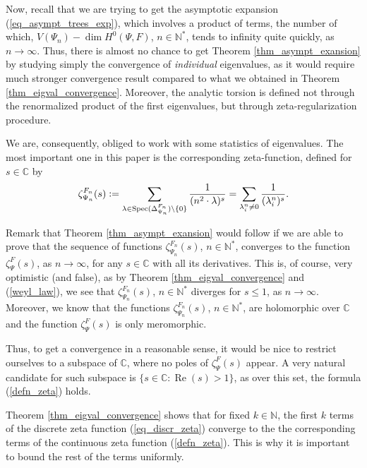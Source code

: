 \documentclass[12pt]{article}
\numberwithin{equation}{section}
\theoremstyle{theorem}
\theoremstyle{definition}
\theoremstyle{remark}
\newcommand{\comp}{\mathbb{C}}
\newcommand{\nat}{\mathbb{N}}
\newcommand{\spec}{{\rm{Spec}}}
\newcommand{\laplcomp}{\Delta}
\renewcommand{\Re}{\operatorname{Re}}
\begin{document}
	\par Now, recall that we are trying to get the asymptotic expansion (\ref{eq_asympt_trees_exp}), which involves a product of terms, the number of which, $V(\Psi_n) - \dim H^0(\Psi, F)$, $n \in \nat^*$, tends to infinity quite quickly, as $n \to \infty$. Thus, there is almost no chance to get Theorem \ref{thm_asympt_exansion} by studying simply the convergence of \textit{individual} eigenvalues, as it would require much stronger convergence result compared to what we obtained in Theorem \ref{thm_eigval_convergence}. 
	Moreover, the analytic torsion is defined not through the renormalized product of the first eigenvalues, but through zeta-regularization procedure.
	\par We are, consequently, obliged to work with some statistics of eigenvalues. 
	The most important one in this paper is the corresponding zeta-function, defined for $s \in \comp$ by
	\begin{equation}\label{eq_discr_zeta}
		\zeta_{\Psi_n}^{F_n}(s) := \sum_{\lambda \in \spec(\laplcomp_{\Psi_n}^{F_n}) \setminus \{0\} } \frac{1}{(n^2 \cdot \lambda)^s} = \sum_{\lambda_i^{n} \neq 0} \frac{1}{(\lambda_i^{n})^s}.
	\end{equation}
	\par Remark that Theorem \ref{thm_asympt_exansion} would follow if we are able to prove that the sequence of functions $\zeta_{\Psi_n}^{F_n}(s)$, $n \in \nat^*$, converges to the function $\zeta_{\Psi}^{F}(s)$, as $n \to \infty$, for any $s \in \comp$ with all its derivatives. This is, of course, very optimistic (and false), as by Theorem \ref{thm_eigval_convergence} and (\ref{weyl_law}), we see that $\zeta_{\Psi_n}^{F_n}(s)$, $n \in \nat^*$ diverges for $s \leq 1$, as $n \to \infty$. Moreover, we know that the functions $\zeta_{\Psi_n}^{F_n}(s)$, $n \in \nat^*$, are holomorphic over $\comp$ and the function $\zeta_{\Psi}^{F}(s)$ is only meromorphic. 
	\par
	Thus, to get a convergence in a reasonable sense, it would be nice to restrict ourselves to a subspace of $\comp$, where no poles of $\zeta_{\Psi}^{F}(s)$ appear. 
	A very natural candidate for such subspace is $\{s \in \comp : \Re(s) > 1 \}$, as over this set, the formula (\ref{defn_zeta}) holds. 
	\par
	Theorem \ref{thm_eigval_convergence} shows that for fixed $k \in \nat$, the first $k$ terms of the discrete zeta function (\ref{eq_discr_zeta}) converge to the the corresponding terms of the continuous zeta function (\ref{defn_zeta}). This is why it is important to  bound the rest of the terms uniformly. 
\end{document}
